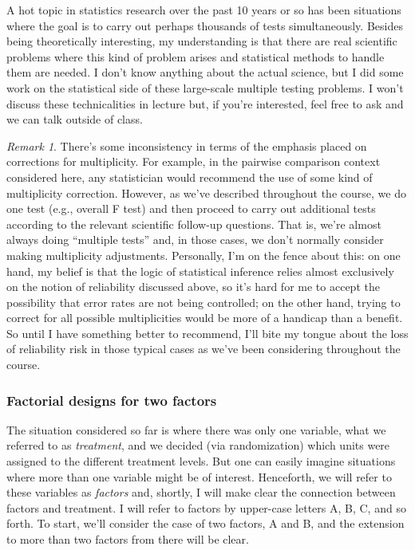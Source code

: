 \documentclass[a4paper, 12pt]{article}
\theoremstyle{plain}
\theoremstyle{definition}
\theoremstyle{remark}
\newtheorem*{remark}{Remark}
\begin{document}
A hot topic in statistics research over the past 10 years or so has been situations where the goal is to carry out perhaps thousands of tests simultaneously.  Besides being theoretically interesting, my understanding is that there are real scientific problems where this kind of problem arises and statistical methods to handle them are needed.  I don't know anything about the actual science, but I did some work on the statistical side of these large-scale multiple testing problems.  I won't discuss these technicalities in lecture but, if you're interested, feel free to ask and we can talk outside of class. 


\begin{remark}
There's some inconsistency in terms of the emphasis placed on corrections for multiplicity.  For example, in the pairwise comparison context considered here, any statistician would recommend the use of some kind of multiplicity correction.  However, as we've described throughout the course, we do one test (e.g., overall F test) and then proceed to carry out additional tests according to the relevant scientific follow-up questions.  That is, we're almost always doing ``multiple tests'' and, in those cases, we don't normally consider making multiplicity adjustments.  Personally, I'm on the fence about this: on one hand, my belief is that the logic of statistical inference relies almost exclusively on the notion of reliability discussed above, so it's hard for me to accept the possibility that error rates are not being controlled; on the other hand, trying to correct for all possible multiplicities would be more of a handicap than a benefit.  So until I have something better to recommend, I'll bite my tongue about the loss of reliability risk in those typical cases as we've been considering throughout the course.  
\end{remark}


\subsubsection*{Factorial designs for two factors}

The situation considered so far is where there was only one variable, what we referred to as {\em treatment}, and we decided (via randomization) which units were assigned to the different treatment levels.  But one can easily imagine situations where more than one variable might be of interest.  Henceforth, we will refer to these variables as {\em factors} and, shortly, I will make clear the connection between factors and treatment.  I will refer to factors by upper-case letters A, B, C, and so forth.  To start, we'll consider the case of two factors, A and B, and the extension to more than two factors from there will be clear.  
\end{document}
